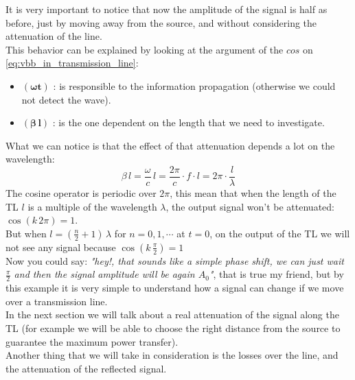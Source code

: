 It is very important to notice that now the amplitude of the signal is half as before, just by moving away from the source, and without considering the attenuation of the line.\\
This behavior can be explained by looking at the argument of the $cos$ on \cref{eq:vbb_in_transmission_line}: 
\begin{itemize}
  \item $\bm{(\omega t)}$ : is responsible to the information propagation (otherwise we could not detect the wave).
  \item $\bm{(\beta\, l)}$ : is the one dependent on the length that we need to investigate.
\end{itemize}
What we can notice is that the effect of that attenuation depends a lot on the wavelength:
\begin{equation*}
  \beta\, l=\frac{\omega}{c}\,l=\frac{2\pi}{c}\cdot f\cdot l=2\pi\cdot\frac{l}{\lambda}
\end{equation*}
The cosine operator is periodic over $2\pi$, this mean that when the length of the TL $l$ is a multiple of the wavelength $\lambda$, the output signal won't be attenuated: $\cos(k\,2\pi)=1$.\\
But when $l = (\frac{n}{2}+1)\,\lambda$ for $n=0,1,\cdots$ at $t=0$, on the output of the TL we will not see any signal because $\cos(k\,\frac{\pi}{2})=1$\\
Now you could say: \textit{"hey!, that sounds like a simple phase shift, we can just wait $\frac{\pi}{2}$ and then the signal amplitude will be again $A_0$"}, that is true my friend, but by this example it is very simple to understand how a signal can change if we move over a transmission line.\\
In the next section we will talk about a real attenuation of the signal along the TL (for example we will be able to choose the right distance from the source to guarantee the maximum power transfer).\\
Another thing that we will take in consideration is the losses over the line, and the attenuation of the reflected signal.
